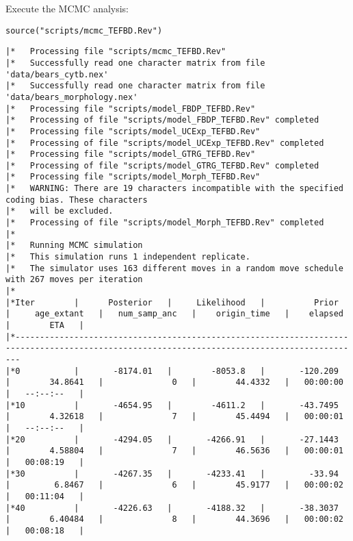 Execute the MCMC analysis:
{\tt \begin{snugshade*}
\begin{lstlisting}
source("scripts/mcmc_TEFBD.Rev")
\end{lstlisting}
\end{snugshade*}}

{\tiny{\tt \begin{snugshade*}
\begin{lstlisting}
|*   Processing file "scripts/mcmc_TEFBD.Rev"
|*   Successfully read one character matrix from file 'data/bears_cytb.nex'
|*   Successfully read one character matrix from file 'data/bears_morphology.nex'
|*   Processing file "scripts/model_FBDP_TEFBD.Rev"
|*   Processing of file "scripts/model_FBDP_TEFBD.Rev" completed
|*   Processing file "scripts/model_UCExp_TEFBD.Rev"
|*   Processing of file "scripts/model_UCExp_TEFBD.Rev" completed
|*   Processing file "scripts/model_GTRG_TEFBD.Rev"
|*   Processing of file "scripts/model_GTRG_TEFBD.Rev" completed
|*   Processing file "scripts/model_Morph_TEFBD.Rev"
|*   WARNING: There are 19 characters incompatible with the specified coding bias. These characters
|*   will be excluded.
|*   Processing of file "scripts/model_Morph_TEFBD.Rev" completed
|*
|*   Running MCMC simulation
|*   This simulation runs 1 independent replicate.
|*   The simulator uses 163 different moves in a random move schedule with 267 moves per iteration
|*
|*Iter        |      Posterior   |     Likelihood   |          Prior   |     age_extant   |   num_samp_anc   |    origin_time   |    elapsed   |        ETA   |
|*---------------------------------------------------------------------------------------------------------------------------------------------
|*0           |       -8174.01   |        -8053.8   |       -120.209   |        34.8641   |              0   |        44.4332   |   00:00:00   |   --:--:--   |
|*10          |       -4654.95   |        -4611.2   |       -43.7495   |        4.32618   |              7   |        45.4494   |   00:00:01   |   --:--:--   |
|*20          |       -4294.05   |       -4266.91   |       -27.1443   |        4.58804   |              7   |        46.5636   |   00:00:01   |   00:08:19   |
|*30          |       -4267.35   |       -4233.41   |         -33.94   |         6.8467   |              6   |        45.9177   |   00:00:02   |   00:11:04   |
|*40          |       -4226.63   |       -4188.32   |       -38.3037   |        6.40484   |              8   |        44.3696   |   00:00:02   |   00:08:18   |
\end{lstlisting}
\end{snugshade*}}}

